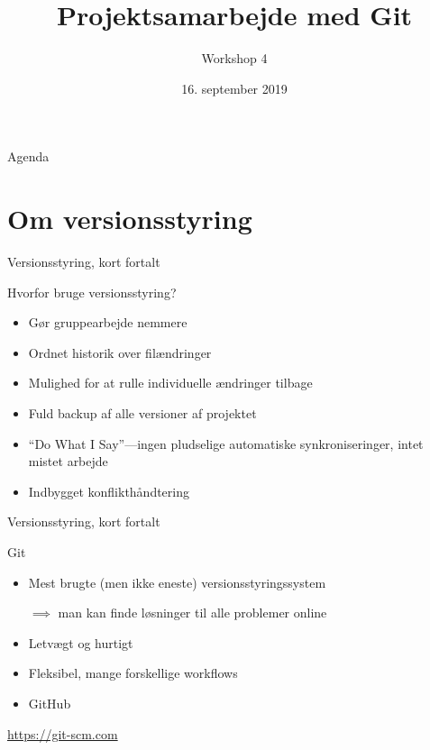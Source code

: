 \documentclass[10pt]{beamer}
\title{Projektsamarbejde med Git}
\subtitle{Workshop 4}
\date{16. september 2019}
\begin{document}
{\aauwavesbg
  \begin{frame}
    \titlepage
  \end{frame}}

\begin{frame}{Agenda}
  \tableofcontents
\end{frame}

\section{Om versionsstyring}
\label{sec:about}

\begin{frame}{Versionsstyring, kort fortalt}
  \begin{block}{Hvorfor bruge versionsstyring?}
    \begin{itemize}
    \item Gør gruppearbejde nemmere
    \item Ordnet historik over filændringer
    \item Mulighed for at rulle individuelle ændringer tilbage
    \item Fuld backup af alle versioner af projektet
    \item ``Do What I Say''---ingen pludselige automatiske synkroniseringer, intet mistet arbejde
    \item Indbygget konflikthåndtering
    \end{itemize}
  \end{block}
\end{frame}

\begin{frame}{Versionsstyring, kort fortalt}
  \begin{block}{Git}
    \begin{itemize}
    \item Mest brugte (men ikke eneste) versionsstyringssystem

      \(\implies\) man kan finde løsninger til alle problemer online
    \item Letvægt og hurtigt
    \item Fleksibel, mange forskellige workflows
    \item GitHub
    \end{itemize}
  \end{block}

  \begin{block}{\url{https://git-scm.com}}
  \end{block}
\end{frame}
\end{document}
